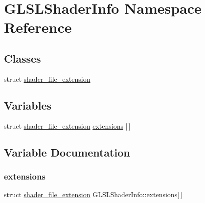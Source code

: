 \hypertarget{namespace_g_l_s_l_shader_info}{}\section{G\+L\+S\+L\+Shader\+Info Namespace Reference}
\label{namespace_g_l_s_l_shader_info}
\subsection*{Classes}
\begin{DoxyCompactItemize}
\item 
struct \mbox{\hyperlink{struct_g_l_s_l_shader_info_1_1shader__file__extension}{shader\+\_\+file\+\_\+extension}}
\end{DoxyCompactItemize}
\subsection*{Variables}
\begin{DoxyCompactItemize}
\item 
struct \mbox{\hyperlink{struct_g_l_s_l_shader_info_1_1shader__file__extension}{shader\+\_\+file\+\_\+extension}} \mbox{\hyperlink{namespace_g_l_s_l_shader_info_ab1e4af0f49188899ac66bcfcd501ca9b}{extensions}} \mbox{[}$\,$\mbox{]}
\end{DoxyCompactItemize}


\subsection{Variable Documentation}
\mbox{\label{namespace_g_l_s_l_shader_info_ab1e4af0f49188899ac66bcfcd501ca9b}} 
\subsubsection{\texorpdfstring{extensions}{extensions}}
{\footnotesize\ttfamily struct \mbox{\hyperlink{struct_g_l_s_l_shader_info_1_1shader__file__extension}{shader\+\_\+file\+\_\+extension}} G\+L\+S\+L\+Shader\+Info\+::extensions\mbox{[}$\,$\mbox{]}}

